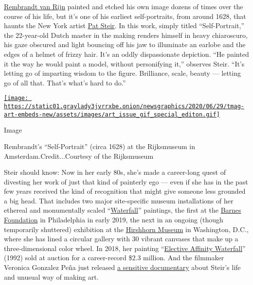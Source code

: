 \href{https://www.nytimes3xbfgragh.onion/2019/02/27/magazine/rembrandt-jan-six.html}{Rembrandt
van Rijn} painted and etched his own image dozens of times over the
course of his life, but it's one of his earliest self-portraits, from
around 1628, that haunts the New York artist
\href{https://www.nytimes3xbfgragh.onion/2019/01/18/arts/design/pat-steir-barnes-foundation-waterfall-kiki-smith-feminist.html}{Pat
Steir}. In this work, simply titled ``Self-Portrait,'' the 22-year-old
Dutch master in the making renders himself in heavy chiaroscuro, his
gaze obscured and light bouncing off his jaw to illuminate an earlobe
and the edges of a helmet of frizzy hair. It's an oddly dispassionate
depiction. ``He painted it the way he would paint a model, without
personifying it,'' observes Steir. ``It's letting go of imparting wisdom
to the figure. Brilliance, scale, beauty --- letting go of all that.
That's what's hard to do.''

\href{https://www.nytimes3xbfgragh.onion/issue/t-magazine/2020/07/02/true-believers-art-issue}{\texttt{[image: https://static01.graylady3jvrrxbe.onion/newsgraphics/2020/06/29/tmag-art-embeds-new/assets/images/art\_issue\_gif\_special\_editon.gif]}}

Image

Rembrandt's ``Self-Portrait'' (circa 1628) at the Rijksmuseum in
Amsterdam.Credit...Courtesy of the Rijksmuseum

Steir should know: Now in her early 80s, she's made a career-long quest
of divesting her work of just that kind of painterly ego --- even if she
has in the past few years received the kind of recognition that might
give someone less grounded a big head. That includes two major
site-specific museum installations of her ethereal and monumentally
scaled
``\href{https://www.metmuseum.org/art/collection/search/497082}{Waterfall}''
paintings, the first at the
\href{https://www.barnesfoundation.org/whats-on/pat-steir-silent-secret-waterfalls}{Barnes
Foundation} in Philadelphia in early 2019, the next in an ongoing
(though temporarily shuttered) exhibition at the
\href{https://hirshhorn.si.edu/exhibitions/pat-steir/}{Hirshhorn Museum}
in Washington, D.C., where she has lined a circular gallery with 30
vibrant canvases that make up a three-dimensional color wheel. In 2018,
her painting
``\href{https://www.phillips.com/detail/pat-steir/NY010318/3}{Elective
Affinity Waterfall}'' (1992) sold at auction for a career-record \$2.3
million. And the filmmaker Veronica Gonzalez Peña just released
\href{https://patsteirthemovie.com/}{a sensitive documentary} about
Steir's life and unusual way of making art.

